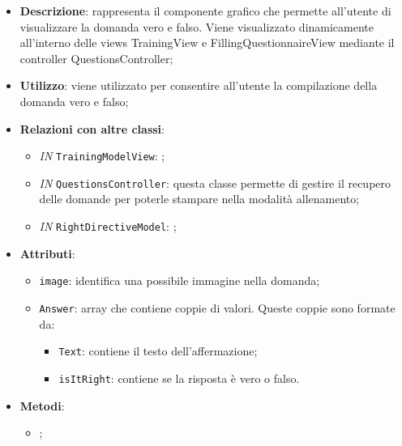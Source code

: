 		\begin{itemize}
			\item \textbf{Descrizione}: rappresenta il componente grafico che permette all'utente di visualizzare la domanda vero e falso. Viene visualizzato dinamicamente all'interno delle views TrainingView e FillingQuestionnaireView mediante il controller QuestionsController;
			\item \textbf{Utilizzo}: viene utilizzato per consentire all'utente la compilazione della domanda vero e falso;
			\item \textbf{Relazioni con altre classi}: 
			\begin{itemize}
				\item \textit{IN} \texttt{TrainingModelView}: ; 
				\item \textit{IN} \texttt{QuestionsController}: questa classe permette di gestire il recupero delle domande per poterle stampare nella modalità allenamento;
				\item \textit{IN} \texttt{RightDirectiveModel}: ;
			\end{itemize}
			\item \textbf{Attributi}: 
			\begin{itemize}
				\item \texttt{image}: identifica una possibile immagine nella domanda;
				\item \texttt{Answer}: array che contiene coppie di valori. Queste coppie sono formate da:
				\begin{itemize}
					\item \texttt{Text}: contiene il testo dell'affermazione;
					\item \texttt{isItRight}: contiene se la risposta è vero o falso.
				\end{itemize}
			\end{itemize}
			\item \textbf{Metodi}: 
			\begin{itemize}
				\item ;
			\end{itemize}
		\end{itemize}																	
